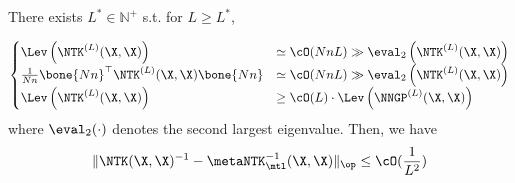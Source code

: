 \documentclass{article}
\begin{document}
\begin{lemma}\label{lemma:kernel-inv-diff}
There exists $L^*\in \mathbb{N}^{+}$ s.t. for $L\geq L^*$, 

\begin{align}\label{eq:med-depth:evals-condition}
    \begin{cases}
    \Lev\left(\NTK^{(L)}(\X,\X)\right) &\simeq \cO(NnL)  \gg \eval_2\left(\NTK^{(L)}(\X,\X)\right)\\
\frac{1}{Nn}\bone{Nn}^\top \NTK^{(L)}(\X,\X)\bone{Nn} &\simeq \cO(NnL) \gg \eval_2\left(\NTK^{(L)}(\X,\X)\right)\\
    \Lev\left(\NTK^{(L)}(\X,\X)\right) &\geq \cO(L) \cdot \Lev \left(\NNGP^{(L)}(\X,\X)\right)\\
    \end{cases}
\end{align}
where $\eval_2(\cdot)$ denotes the second largest eigenvalue. Then, we have
\begin{align}\label{eq:ntk-mtl:F-norm:supp}
    \|\NTK(\X,\X)^{-1} - \metaNTK_\mtl^{-1}(\X,\X)\|_{\op} \leq \cO(\frac {1}{L^2})
\end{align}
    
\end{lemma}
\end{document}
